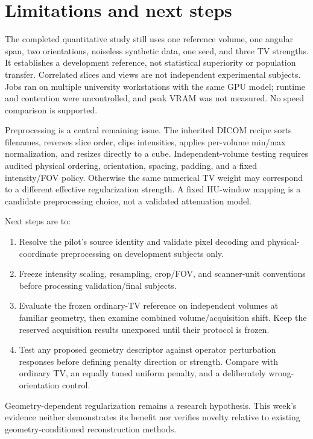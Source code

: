 \documentclass[10pt,a4paper]{article}
\begin{document}
\section{Limitations and next steps}
The completed quantitative study still uses one reference volume, one angular span, two orientations, noiseless synthetic data, one seed, and three TV strengths. It establishes a development reference, not statistical superiority or population transfer. Correlated slices and views are not independent experimental subjects. Jobs ran on multiple university workstations with the same GPU model; runtime and contention were uncontrolled, and peak VRAM was not measured. No speed comparison is supported.

Preprocessing is a central remaining issue. The inherited DICOM recipe sorts filenames, reverses slice order, clips intensities, applies per-volume min/max normalization, and resizes directly to a cube. Independent-volume testing requires audited physical ordering, orientation, spacing, padding, and a fixed intensity/FOV policy. Otherwise the same numerical TV weight may correspond to a different effective regularization strength. A fixed HU-window mapping is a candidate preprocessing choice, not a validated attenuation model.

Next steps are to:
\begin{enumerate}
\item Resolve the pilot's source identity and validate pixel decoding and physical-coordinate preprocessing on development subjects only.
\item Freeze intensity scaling, resampling, crop/FOV, and scanner-unit conventions before processing validation/final subjects.
\item Evaluate the frozen ordinary-TV reference on independent volumes at familiar geometry, then examine combined volume/acquisition shift. Keep the reserved acquisition results unexposed until their protocol is frozen.
\item Test any proposed geometry descriptor against operator perturbation responses before defining penalty direction or strength. Compare with ordinary TV, an equally tuned uniform penalty, and a deliberately wrong-orientation control.
\end{enumerate}
Geometry-dependent regularization remains a research hypothesis. This week's evidence neither demonstrates its benefit nor verifies novelty relative to existing geometry-conditioned reconstruction methods.
\end{document}
